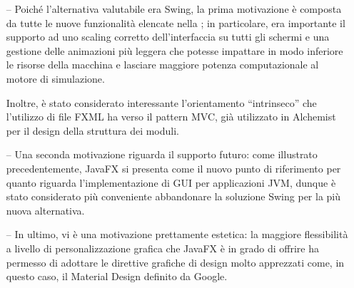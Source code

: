         \begin{itemize}
            \item[--] Poiché l'alternativa valutabile era Swing, la prima motivazione è composta da tutte le nuove funzionalità elencate nella ; in particolare, era importante il supporto ad uno scaling corretto dell'interfaccia su tutti gli schermi e una gestione delle animazioni più leggera che potesse impattare in modo inferiore le risorse della macchina e lasciare maggiore potenza computazionale al motore di simulazione.

            Inoltre, è stato considerato interessante l'orientamento ``intrinseco'' che l'utilizzo di file FXML ha verso il pattern MVC, già utilizzato in Alchemist per il design della struttura dei moduli.

            \item[--] Una seconda motivazione riguarda il supporto futuro: come illustrato precedentemente, JavaFX si presenta come il nuovo punto di riferimento per quanto riguarda l'implementazione di GUI per applicazioni JVM, dunque è stato considerato più conveniente abbandonare la soluzione  Swing per la più nuova alternativa.

            \item[--] In ultimo, vi è una motivazione prettamente estetica: la maggiore flessibilità a livello di personalizzazione grafica che JavaFX è in grado di offrire ha permesso di adottare le direttive grafiche di design molto apprezzati come, in questo caso, il Material Design definito da Google.
        \end{itemize}
